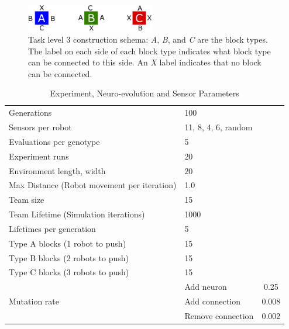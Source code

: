 \documentclass[conference]{IEEEtran}
\begin{document}
\begin{figure}[t]
	\centering
	\includegraphics[width=0.5\textwidth]{ConstructionSchema.eps}
	\caption{Task level 3 construction schema: \textit{A}, \textit{B}, and \textit{C} are the block types.  The label on
each side of each block type indicates what block type can be connected to this side.  An \textit{X} label indicates
that no block can be connected.}\label{fig:constructionSchema}
\end{figure}



\begin{table}
	\renewcommand{\arraystretch}{1.30}
	\caption{Experiment, Neuro-evolution and Sensor Parameters}\label{tab:simParameters}
	\centering
	\begin{tabular}{llc}
		\hline
		Generations	                                           & 100	\\
		Sensors per robot                                      & 11, 8, 4, 6, random \\	
		Evaluations per genotype                               & 5  \\
		Experiment runs                                        & 20 \\
		Environment length, width                              & 20 \\
        Max Distance (Robot movement per iteration)            & 1.0 \\
        Team size                                              & 15 \\
        Team Lifetime (Simulation iterations)                  & 1000 \\	
        Lifetimes per generation                               & 5 \\
        Type A blocks (1 robot to push)                        & 15 \\
        Type B blocks (2 robots to push)                       & 15 \\
        Type C blocks (3 robots to push)                       & 15 \\
		\hline
		\multirow{4}{*}{Mutation rate} & Add neuron            & 0.25 \\
		& Add connection                                       & 0.008  \\
		& Remove connection                                    & 0.002 \\

\end{tabular}
\end{table}
\end{document}
